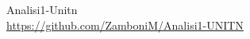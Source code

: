 \begin{center}
	\begin{Huge}
		Analisi1-Unitn\\
		\url{https://github.com/ZamboniM/Analisi1-UNITN}
	\end{Huge}
\end{center}
